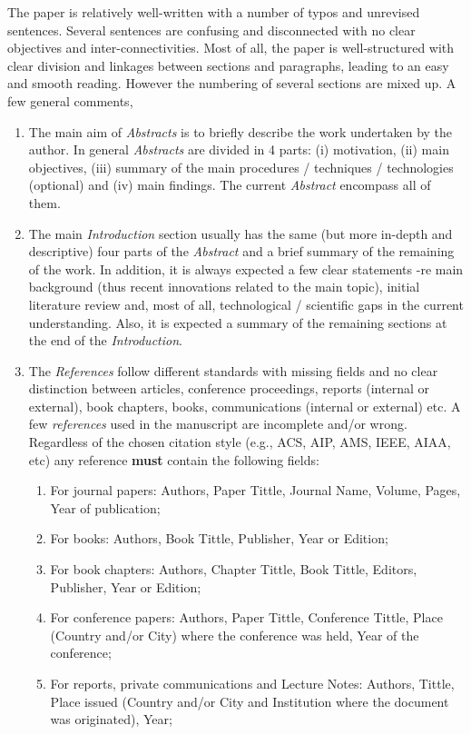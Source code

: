 \documentclass[14pt,twoside]{report}
\begin{document}
The paper is relatively well-written with a number of typos and unrevised sentences. Several sentences are confusing and disconnected with no clear objectives and inter-connectivities. Most of all, the paper is well-structured with clear division and linkages between sections and paragraphs, leading to an easy and smooth reading. However the numbering of several sections are mixed up. A few general comments,
\begin{enumerate}
%
\item The main aim of {\it Abstracts} is to briefly describe the work undertaken by the author. In general {\it Abstracts} are divided in 4 parts: (i) motivation, (ii) main objectives, (iii) summary of the main procedures / techniques / technologies (optional) and (iv) main findings. The current {\it Abstract} encompass all of them.
%
\item The main {\it Introduction} section usually has the same (but more in-depth and descriptive) four parts of the {\it Abstract} and a brief summary of the remaining of the work. In addition, it is always expected a few clear statements -re main background (thus recent innovations related to the main topic), initial literature review and, most of all, technological / scientific gaps in the current understanding. Also, it is expected a summary of the remaining sections at the end of the {\it Introduction}. 
%
\item The {\it References} follow different standards with missing fields and no clear distinction between articles, conference proceedings, reports (internal or external), book chapters, books, communications (internal or external) etc.  A few {\it references} used in the manuscript are incomplete and/or wrong. Regardless of the chosen citation style (e.g., ACS, AIP, AMS, IEEE, AIAA, etc) any reference {\bf must} contain the following fields: 
\begin{enumerate}
\item For journal papers: Authors, Paper Tittle, Journal Name, Volume, Pages, Year of publication;
\item For books: Authors, Book Tittle, Publisher, Year or Edition;
\item For book chapters: Authors, Chapter Tittle, Book Tittle, Editors, Publisher, Year or Edition;
\item For conference papers: Authors, Paper Tittle, Conference Tittle, Place (Country and/or City) where the conference was held, Year of the conference;
\item For reports,  private communications and Lecture Notes: Authors, Tittle, Place issued (Country and/or City and Institution where the document was originated), Year;

\end{enumerate}
\end{enumerate}
\end{document}
